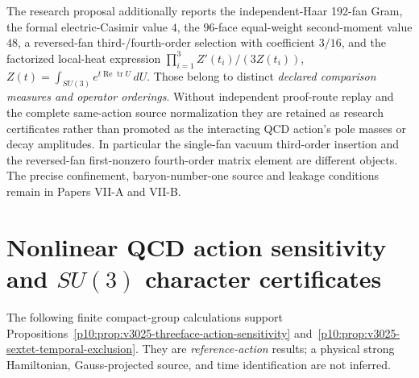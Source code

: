 \documentclass[12pt,a4paper]{article}
\begin{document}
\begin{remark}
\label{p12:rem:v365-haar-jet-quarantine}
The research proposal additionally reports the independent-Haar
192-fan Gram, the formal electric-Casimir value $4$, the
$96$-face equal-weight second-moment value $48$, a reversed-fan
third-/fourth-order selection with coefficient $3/16$, and the
factorized local-heat expression
$\prod_{i=1}^3 Z'(t_i)/(3Z(t_i))$,
$Z(t)=\int_{SU(3)}e^{t\operatorname{Re}\operatorname{tr}U}\,dU$.
Those belong to distinct \emph{declared comparison measures and
operator orderings}.  Without independent proof-route replay and
the complete same-action source normalization they are retained
as research certificates rather than promoted as the interacting
QCD action's pole masses or decay amplitudes.  In particular the
single-fan vacuum third-order insertion and the reversed-fan
first-nonzero fourth-order matrix element are different objects.
The precise confinement, baryon-number-one source and leakage
conditions remain in Papers VII-A and VII-B.
\end{remark}



\section{Nonlinear QCD action sensitivity and $SU(3)$ character certificates}
\label{p13:sec:v3025-nonlinear-qcd-action}
The following finite compact-group calculations support
Propositions~\ref{p10:prop:v3025-threeface-action-sensitivity}
and~\ref{p10:prop:v3025-sextet-temporal-exclusion}.  They are
\emph{reference-action} results; a physical strong Hamiltonian,
Gauss-projected source, and time identification are not inferred.
\end{document}
